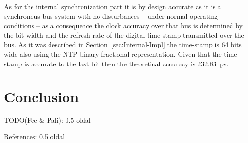 \documentclass[article]{IEEEtran}
\begin{document}
As for the internal synchronization part it is by design accurate as it is a synchronous bus system with no disturbances -- under normal operating conditions -- as a
consequence the clock accuracy over that bus is determined by the bit width and the refresh rate of the digital time-stamp transmitted over the bus. As it was described in Section~\ref{sec:Internal-Impl} the 
time-stamp is 64 bits wide also using the NTP binary fractional representation. Given that the time-stamp is accurate to the last bit then the theoretical accuracy is \SI{232.83}{\pico\second}.


\section{Conclusion}

TODO(Fec \& Pali): 0.5 oldal


References: 0.5 oldal


%
%

%

%
%
\end{document}
